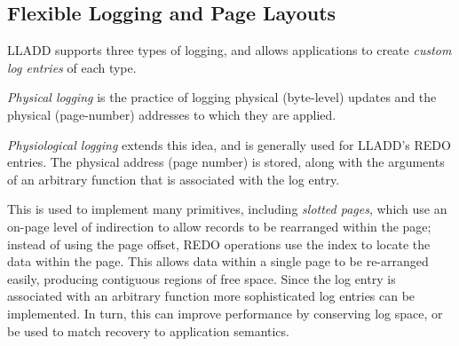 \documentclass[10pt,letterpaper,twocolumn,english]{article}
\newcommand{\yad}{LLADD\xspace}
\begin{document}
%


\subsection{Flexible Logging and Page Layouts}
\label{flex-logging}
\label{page-layouts}

\yad supports three types of logging, and allows applications to create
{\em custom log entries} of each type.

{\em Physical logging } 
is the practice of logging physical (byte-level) updates
and the physical (page-number) addresses to which they are applied.

{\em Physiological logging } extends this idea, and is generally used 
for \yad's REDO entries.  The physical address (page number) is
stored, along with the arguments of an arbitrary function that 
is associated with the log entry.~\cite{physiologicalLogging}

This is used to implement many primitives, including {\em slotted pages}, which use
an on-page level of indirection to allow records to be rearranged
within the page; instead of using the page offset, REDO operations use
the index to locate the data within the page. This allows data within a single
page to be re-arranged easily, producing contiguous regions of
free space.  Since the log entry is associated with an arbitrary function
more sophisticated log entries can be implemented.  In turn, this can improve 
performance by conserving log space, or be used to match recovery to application
semantics.
\end{document}
